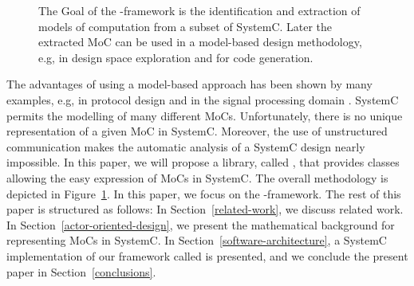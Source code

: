 \begin{figure}[t]
\centering
\resizebox{0.95\textwidth}{!}{}
\caption{\label{fig:SysteMoC-Goals}The Goal of the \SysteMoC{}-framework
  is the identification and extraction of models of computation
  from a subset of SystemC. Later the extracted MoC can be used
  in a model-based design methodology, e.g, in design space exploration
  and for code generation.
}
\end{figure}
The advantages of using a model-based approach has been shown
by many examples, e.g, in protocol design \cite{SDL-92} and
in the signal processing domain \cite{bhattacharyya,bb:2000a}.
SystemC permits the modelling of many different MoCs.
Unfortunately, there is no unique representation of a given
MoC in SystemC. Moreover, the use of unstructured communication makes
the automatic analysis of a SystemC design nearly impossible.
In this paper, we will propose a library, called \SysteMoC{},
that provides classes allowing the easy expression of MoCs
in SystemC. The overall methodology is depicted in Figure~\ref{fig:SysteMoC-Goals}.
In this paper, we focus on the \SysteMoC{}-framework.
The rest of this paper is structured as follows:
In Section~\ref{related-work}, we discuss related work. In
Section~\ref{actor-oriented-design}, we present the mathematical background for
representing MoCs in SystemC. In Section~\ref{software-architecture},
a SystemC implementation of our framework called \SysteMoC{} is
presented,
and we conclude the present paper in Section~\ref{conclusions}.

